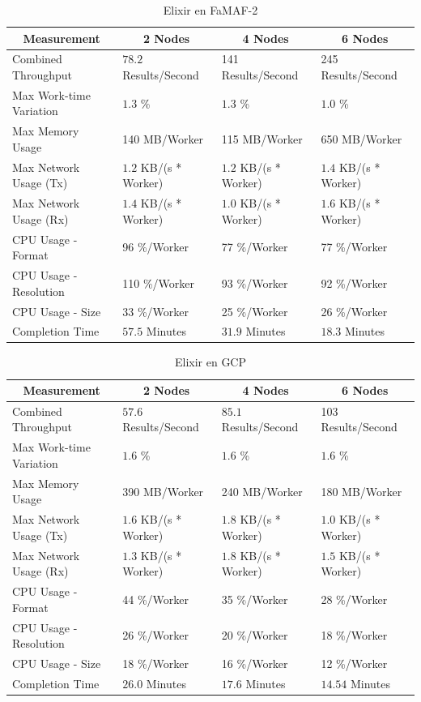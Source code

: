 \documentclass[11pt]{article}
\begin{document}
\begin{table}[H]
\centering
\begin{tabular}{|l|l|l|l|}
\hline
\multicolumn{1}{|c|}{Measurement} & \multicolumn{1}{c|}{2 Nodes} & \multicolumn{1}{c|}{4 Nodes} & \multicolumn{1}{c|}{6 Nodes} \\ \hline
Combined Throughput & $78.2$ Results/Second & 141 Results/Second & 245 Results/Second \\ \hline
Max Work-time Variation & $1.3$ \% & $1.3$ \% & $1.0$ \% \\ \hline
Max Memory Usage & 140 MB/Worker & 115 MB/Worker & 650 MB/Worker \\ \hline
Max Network Usage (Tx) & $1.2$ KB/(s * Worker) & $1.2$ KB/(s * Worker) & $1.4$ KB/(s * Worker) \\ \hline
Max Network Usage (Rx) & $1.4$ KB/(s * Worker) & $1.0$ KB/(s * Worker) & $1.6$ KB/(s * Worker) \\ \hline
CPU Usage - Format & 96 \%/Worker & 77 \%/Worker & 77 \%/Worker \\ \hline
CPU Usage - Resolution & 110 \%/Worker & 93 \%/Worker & 92 \%/Worker \\ \hline
CPU Usage - Size & 33 \%/Worker & 25 \%/Worker & 26 \%/Worker \\ \hline
Completion Time & $57.5$ Minutes & $31.9$ Minutes & $18.3$ Minutes \\ \hline
\end{tabular}
\caption{Elixir en FaMAF-2}
\end{table}

\begin{table}[H]
\centering
\begin{tabular}{|l|l|l|l|}
\hline
\multicolumn{1}{|c|}{Measurement} & \multicolumn{1}{c|}{2 Nodes} & \multicolumn{1}{c|}{4 Nodes} & \multicolumn{1}{c|}{6 Nodes} \\ \hline
Combined Throughput & $57.6$ Results/Second & $85.1$ Results/Second & 103 Results/Second \\ \hline
Max Work-time Variation & $1.6$ \% & $1.6$ \% & $1.6$ \% \\ \hline
Max Memory Usage & 390 MB/Worker & 240 MB/Worker & 180 MB/Worker \\ \hline
Max Network Usage (Tx) & $1.6$ KB/(s * Worker) & $1.8$ KB/(s * Worker) & $1.0$ KB/(s * Worker) \\ \hline
Max Network Usage (Rx) & $1.3$ KB/(s * Worker) & $1.8$ KB/(s * Worker) & $1.5$ KB/(s * Worker) \\ \hline
CPU Usage - Format & 44 \%/Worker & 35 \%/Worker & 28 \%/Worker \\ \hline
CPU Usage - Resolution & 26 \%/Worker & 20 \%/Worker & 18 \%/Worker \\ \hline
CPU Usage - Size & 18 \%/Worker & 16 \%/Worker & 12 \%/Worker \\ \hline
Completion Time & $26.0$ Minutes & $17.6$ Minutes & $14.54$ Minutes \\ \hline
\end{tabular}
\caption{Elixir en GCP}
\end{table}
\end{document}
